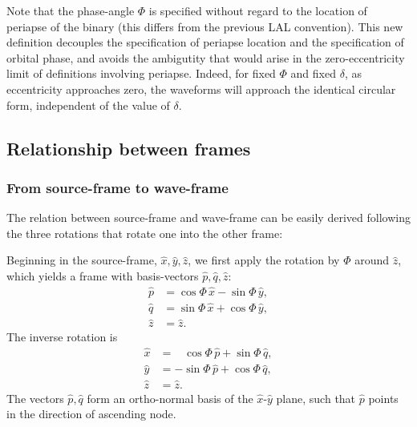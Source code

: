 \documentclass[aps,prd,amssymb,amsmath,amsfonts,superscriptaddress,
floatfix ,preprintnumbers,altaffilletter]{revtex4}
\newcommand{\ExS}{{{\hat x}}}
\newcommand{\EyS}{{{\hat y}}}
\newcommand{\EzS}{{{\hat z}}}
\newcommand{\phiRef}{\Phi} %
\newcommand{\meanAnomaly}{\delta} %
\begin{document}
Note that the phase-angle $\phiRef$ is specified without regard to the
location of periapse of the binary (this differs from the previous LAL
convention).  This new definition decouples the specification of
periapse location and the specification of orbital phase, and avoids
the ambigutity that would arise in the zero-eccentricity limit of
definitions involving periapse.  Indeed, for fixed $\phiRef$ and fixed
$\meanAnomaly$, as eccentricity approaches zero, the waveforms will
approach the identical circular form, independent of the value of
$\meanAnomaly$.




\subsection{Relationship between frames}
\label{sec:Relations}

\subsubsection{From source-frame to wave-frame}

The relation between source-frame and wave-frame can be easily derived
following the three rotations that rotate one into the other frame:


Beginning in the source-frame, $\ExS, \EyS, \EzS$, we first apply the rotation
by $\phiRef$ around $\EzS$, which yields a frame with basis-vectors $\hat p, \hat q, \EzS$:
\begin{subequations}
  \label{eq:phiRef-Rotation1}
\begin{align}
  \hat p &= \cos\phiRef\,\ExS - \sin\phiRef\,\EyS,\\
  \hat q &= \sin\phiRef\,\ExS+\cos\phiRef\,\EyS,\\
  \EzS & = \EzS.
\end{align}
\end{subequations}
The inverse rotation is
\begin{subequations}
  \label{eq:phiRef-Rotation2}
\begin{align}
  \ExS &= \;\;\;\cos\phiRef\,\hat p + \sin\phiRef\,\hat q,\\
  \EyS &= -\sin\phiRef\,\hat p+\cos\phiRef\,\hat q,\\
  \EzS & = \EzS.
\end{align}
\end{subequations}
The vectors $\hat p, \hat q$ form an ortho-normal basis of the
$\ExS$-$\EyS$ plane, such that $\hat p$ points in the direction of
ascending node.
\end{document}
